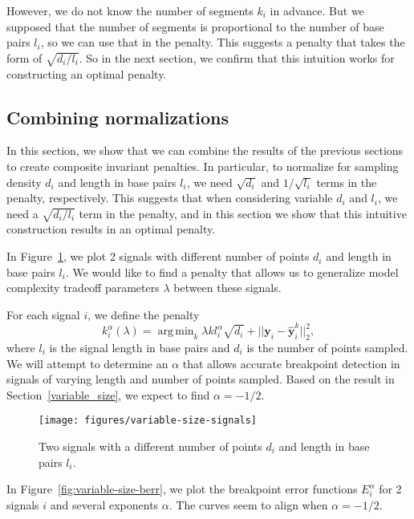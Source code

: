 \documentclass{jsfds} %
\DeclareMathOperator*{\argmin}{arg\,min}
\begin{document}
However, we do not know the number of segments $k_i$ in advance. But
we supposed that the number of segments is proportional to the number
of base pairs $l_i$, so we can use that in the penalty. This suggests
a penalty that takes the form of $\sqrt{d_i/l_i}$. So in the next
section, we confirm that this intuition works for constructing an
optimal penalty.


\newpage
\subsection{Combining normalizations}
\label{combining_penalties}
In this section, we show that we can combine the results of the
previous sections to create composite invariant penalties. In
particular, to normalize for sampling density $d_i$ and length in base
pairs $l_i$, we need $\sqrt{d_i}$ and $1/\sqrt{l_i}$ terms in the
penalty, respectively. This suggests that when considering variable
$d_i$ and $l_i$, we need a $\sqrt{d_i/l_i}$ term in the penalty, and
in this section we show that this intuitive construction results in an
optimal penalty.

In Figure~\ref{fig:variable-size-signals}, we plot 2 signals with
different number of points $d_i$ and length in base pairs $l_i$. We
would like to find a penalty that allows us to generalize model
complexity tradeoff parameters $\lambda$ between these signals.

For each signal $i$, we define the penalty
\begin{equation}
  \label{eq:kstar_composite}
  k_i^\alpha(\lambda) = \argmin_k \lambda k l_i^\alpha \sqrt{d_i}
  + ||\mathbf y_i - \mathbf{\hat y}_i^k||^2_2,
\end{equation}
where $l_i$ is the signal length in base pairs and $d_i$ is the number
of points sampled. We will attempt to determine an $\alpha$ that
allows accurate breakpoint detection in signals of varying length and
number of points sampled. Based on the result in
Section~\ref{variable_size}, we expect to find $\alpha=-1/2$.

\begin{figure}[H]
  \centering
\texttt{[image: figures/variable-size-signals]}
  \caption{Two signals with a different number of
    points $d_i$ and length in base pairs $l_i$.}
\label{fig:variable-size-signals}
\end{figure}

\newpage

In Figure~\ref{fig:variable-size-berr}, we plot the breakpoint error
functions $E_i^\alpha$ for 2 signals $i$ and several exponents
$\alpha$. The curves seem to align when $\alpha=-1/2$.
\end{document}
